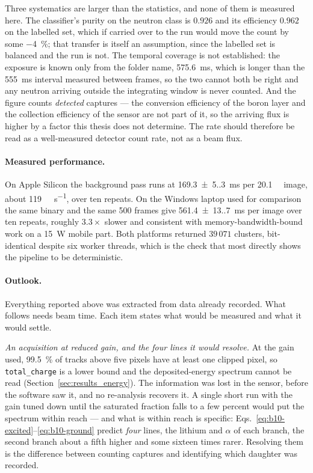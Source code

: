 \documentclass[a4paper,headsepline,oneside,11pt]{scrartcl}
\begin{document}
Three systematics are larger than the statistics, and none of them is measured
here. The classifier's purity on the neutron class is $0.926$ and its efficiency
$0.962$ on the labelled set, which if carried over to the run would move the
count by some \SI{-4}{\percent}; that transfer is itself an assumption, since the labelled
set is balanced and the run is not. The temporal coverage is not established: the
exposure is known only from the folder name, \SI{575.6}{\milli\second}, which is longer than the
\SI{555}{\milli\second} interval measured between frames, so the two cannot both be right and
any neutron arriving outside the integrating window is never counted. And the
figure counts \emph{detected} captures --- the conversion efficiency of the boron
layer and the collection efficiency of the sensor are not part of it, so the
arriving flux is higher by a factor this thesis does not determine. The rate
should therefore be read as a well-measured detector count rate, not as a beam
flux.

\paragraph{Measured performance.} On Apple Silicon the background pass runs at
\SI{169.3(5.3)}{\milli\second} per \SI{20.1}{\mega\pixel} image, about \SI{119}{\mega\pixel\per\second}, over ten
repeats. On the Windows laptop used for comparison the same binary and the same
500 frames give \SI{561.4(13.7)}{\milli\second} per image over ten repeats, roughly
$3.3\times$ slower and
consistent with memory-bandwidth-bound work on a \SI{15}{\watt} mobile part. Both
platforms returned $39\,071$ clusters, bit-identical despite six worker
threads, which is the check that most directly shows the pipeline to be
deterministic.

\paragraph{Outlook.} Everything reported above was extracted from data already
recorded. What follows needs beam time. Each item states what would be measured
and what it would settle.

\emph{An acquisition at reduced gain, and the four lines it would resolve.} At
the gain used, \SI{99.5}{\percent} of tracks above five pixels have at least one clipped
pixel, so \texttt{total\_charge} is a lower bound and the deposited-energy
spectrum cannot be read (Section~\ref{sec:results_energy}). The information was
lost in the sensor, before the software saw it, and no re-analysis recovers it.
A single short run with the gain tuned down until the saturated fraction falls to
a few percent would put the spectrum within reach --- and what is within reach is
specific: Eqs.~\eqref{eq:b10-excited}--\eqref{eq:b10-ground} predict
\emph{four} lines, the lithium and $\alpha$ of each branch, the second branch
about a fifth higher and some sixteen times rarer. Resolving them is the difference
between counting captures and identifying which daughter was recorded.
\end{document}
